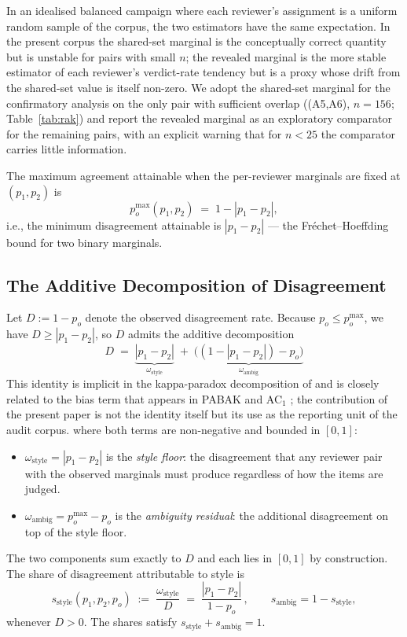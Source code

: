 \documentclass[11pt,a4paper]{article}
\newcommand{\Acc}[1]{\textsf{A#1}}
\begin{document}
In an idealised balanced campaign where each reviewer's assignment is
a uniform random sample of the corpus, the two estimators have the
same expectation. In the present corpus the shared-set marginal is
the conceptually correct quantity but is unstable for pairs with
small $n$; the revealed marginal is the more stable estimator of
each reviewer's verdict-rate tendency but is a proxy whose drift
from the shared-set value is itself non-zero. We adopt the
shared-set marginal for the confirmatory analysis on the only pair
with sufficient overlap ((\Acc{5},\Acc{6}), $n=156$;
Table~\ref{tab:rak}) and report the revealed marginal as an
exploratory comparator for the remaining pairs, with an explicit
warning that for $n<25$ the comparator carries little information.

The maximum agreement attainable when the per-reviewer marginals
are fixed at $(p_1,p_2)$ is
\[
p_o^{\max}(p_1,p_2) \;=\; 1 - |p_1-p_2|,
\]
i.e., the minimum disagreement attainable is $|p_1-p_2|$ --- the
Fr\'echet--Hoeffding bound for two binary marginals.

\subsection{The Additive Decomposition of Disagreement}
\label{sec:rak-additive}

Let $D := 1-p_o$ denote the observed disagreement rate. Because
$p_o\le p_o^{\max}$, we have $D \ge |p_1-p_2|$, so $D$ admits the
additive decomposition
%
\begin{equation}
\boxed{\;\;
D \;=\; \underbrace{|p_1-p_2|}_{\omega_{\text{style}}}
       \;+\;
       \underbrace{\bigl((1-|p_1-p_2|)-p_o\bigr)}_{\omega_{\text{ambig}}}
\;\;}
\label{eq:decomp}
\end{equation}
%
This identity is implicit in the kappa-paradox decomposition of
\citet{feinstein1990high} and is closely related to the
bias term that appears in PABAK \citep{byrt1993bias} and AC$_1$
\citep{gwet2008computing}; the contribution of the present paper is
not the identity itself but its use as the reporting unit of the
audit corpus.
%
where both terms are non-negative and bounded in $[0,1]$:
%
\begin{itemize}[leftmargin=*,topsep=2pt,nosep]
\item $\omega_{\text{style}}=|p_1-p_2|$ is the
       \emph{style floor}: the disagreement that any reviewer pair with
       the observed marginals must produce regardless of how the items
       are judged.
\item $\omega_{\text{ambig}}=p_o^{\max}-p_o$ is the
       \emph{ambiguity residual}: the additional disagreement on top
       of the style floor.
\end{itemize}
%
The two components sum exactly to $D$ and each lies in $[0,1]$ by
construction. The share of disagreement attributable to style is
\[
s_{\text{style}}(p_1,p_2,p_o) \;:=\;
\frac{\omega_{\text{style}}}{D}
\;=\;\frac{|p_1-p_2|}{1-p_o}\,, \qquad
s_{\text{ambig}}=1-s_{\text{style}},
\]
whenever $D>0$. The shares satisfy $s_{\text{style}}+s_{\text{ambig}}=1$.
\end{document}
